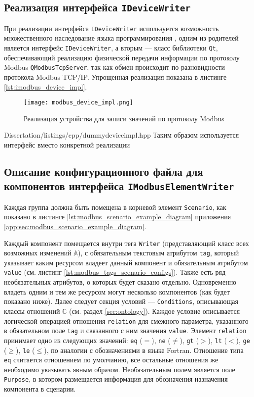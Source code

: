 \subsection{Реализация интерфейса \texttt{IDeviceWriter}}
При реализации интерфейса \texttt{IDeviceWriter} используется возможность множественного наследование языка программирования \cpp,
одним из родителей является интерфейс \texttt{IDeviceWriter},
а вторым --- класс библиотеки \texttt{Qt}, обеспечивающий реализацию физической передачи информации по протоколу Modbus
\texttt{QModbusTcpServer}, так как обмен происходит по разновидности протокола Modbus TCP/IP.
Упрощенная реализация показана в листинге \ref{lst:imodbus_device_impl}.
\begin{center}
    \begin{figure}
        \texttt{[image: modbus\_device\_impl.png]}
        \caption{Реализация устройства для записи значений по протоколу Modbus}\label{fig:modbus_device_imp}
    \end{figure}
\end{center}

        {Dissertation/listings/cpp/dummydeviceimpl.hpp}
Таким образом используется интерфейс вместо конкретной реализации \cite[стр. 47-48]{book:pattern:head_first}


\subsection{Описание конфигурационного файла для компонентов интерфейса \texttt{IModbusElementWriter}}
Каждая группа должна быть помещена в корневой элемент \texttt{Scenario},
как показано в листинге \ref{lst:modbus_scenario_example_diagram} приложения \ref{app:sec:modbus_scenario_example_diagram}.

Каждый компонент помещается внутри тега \texttt{Writer} (представляющий класс всех возможных изменений $\mathbb{A}$),
с обязательным текстовым атрибутом \texttt{tag}, который указывает каким ресурсом владеет данный компонент
и обязательным атрибутом \texttt{value} (см. листинг \ref{lst:modbus_tags_scenario_configs}).
Также есть ряд необязательных атрибутов, о которых будет сказано отдельно. 
Одновременно владеть одним и тем же ресурсом могут несколько компонентов (как будет показано ниже).
Далее следует секция условий --- \texttt{Conditions},
описывающая классы отношений $\mathbb{C}$ (см. раздел \ref{sec:ontology}).
Каждое условие описывается логической операцией отношения \texttt{relation} для смежного параметра,
указанного в обязательном поле \texttt{tag} и связанного с ним значения \texttt{value}.
Элемент \texttt{relation} принимает одно из следующих значений:
\texttt{eq} ($=$),
\texttt{ne} ($\neq$),
\texttt{gt} ($>$),
\texttt{lt} ($<$),
\texttt{ge} ($\geq$),
\texttt{le} ($\leq$), по аналогии с обозначениями в языке Fortran.
Отношение типа \texttt{eq} считается отношением по умолчанию,
все остальные отношения же необходимо указывать явным образом.
Необязательным полем является поле \texttt{Purpose}, в котором размещается информация для
обозначения назначения компонента в сценарии.

